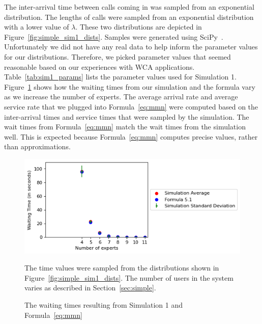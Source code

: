 The inter-arrival time between calls coming in was sampled from an exponential
distribution.
The lengths of calls were sampled from an exponential distribution with
a lower value of $\lambda$.
These two distributions are depicted in Figure~\ref{fig:simple_sim1_dists}.
Samples were generated using SciPy~\cite{scipy}.
Unfortunately we did not have any real data to help inform the parameter values
for our distributions.
Therefore, we picked parameter values that seemed reasonable based on our
experiences with WCA applications.
Table~\ref{tab:sim1_params} lists the parameter values used for Simulation 1.
Figure~\ref{fig:simple_sim1_results} shows how the waiting times from our
simulation and the formula vary as we increase the number of experts.
The average arrival rate and average service rate that we plugged into
Formula~\ref{eq:mmn} were computed based on the inter-arrival times and service
times that were sampled by the simulation.
The wait times from Formula~\ref{eq:mmn} match the wait times from the
simulation well.
This is expected because Formula~\ref{eq:mmn} computes precise values, rather
than approximations.

\begin{figure}[h]
  \includegraphics{figures/montecarlo/independent_calls_expon.png}
  \begin{captiontext}
    The time values were sampled from the distributions shown in
    Figure~\ref{fig:simple_sim1_dists}.
    The number of users in the system varies as described in
    Section~\ref{sec:simple}.
  \end{captiontext}
  \caption{
    The waiting times resulting from Simulation 1 and Formula~\ref{eq:mmn}
  }\label{fig:simple_sim1_results}
\end{figure}

